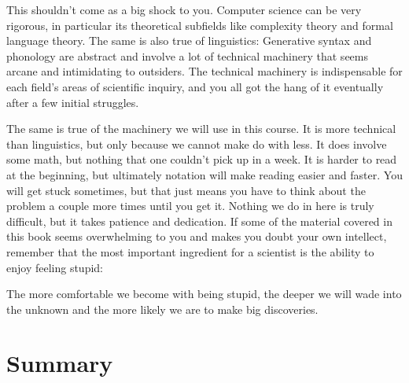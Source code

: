 This shouldn't come as a big shock to you.
Computer science can be very rigorous, in particular its theoretical subfields like complexity theory and formal language theory.
The same is also true of linguistics:
Generative syntax and phonology are abstract and involve a lot of technical machinery that seems arcane and intimidating to outsiders.
The technical machinery is indispensable for each field's areas of scientific inquiry, and you all got the hang of it eventually after a few initial struggles.

The same is true of the machinery we will use in this course.
It is more technical than linguistics, but only because we cannot make do with less.
It does involve some math, but nothing that one couldn't pick up in a week.
It is harder to read at the beginning, but ultimately notation will make reading easier and faster.
You will get stuck sometimes, but that just means you have to think about the problem a couple more times until you get it.
Nothing we do in here is truly difficult, but it takes patience and dedication.
If some of the material covered in this book seems overwhelming to you and makes you doubt your own intellect, remember that the most important ingredient for a scientist is the ability to enjoy feeling stupid:

\begin{fancyquote}
    The more comfortable we become with being stupid, the deeper we will wade into the unknown and the more likely we are to make big discoveries.
    \hfill
    \citep{Schwartz08}
\end{fancyquote}

\section{Summary}
\label{sec:formal_summary}

